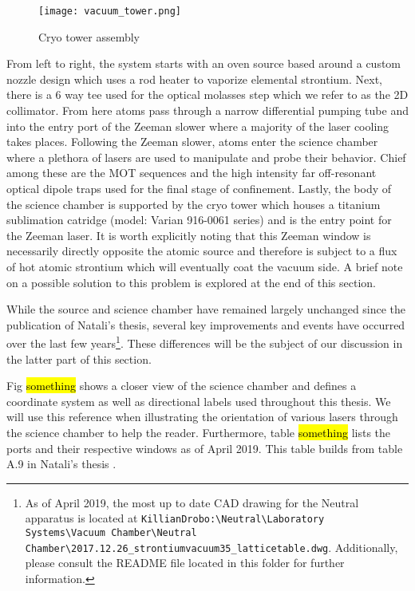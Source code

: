 	\begin{figure} 
		\centerline{
		\texttt{[image: vacuum\_tower.png]}}
		\caption{Cryo tower assembly}
		\label{fig:cryoTower}
	\end{figure}
From left to right, the system starts with an oven source based around a custom nozzle design which uses a rod heater to vaporize elemental strontium.
Next, there is a 6 way tee used for the optical molasses step which we refer to as the 2D collimator. 
From here atoms pass through a narrow differential pumping tube and into the entry port of the Zeeman slower where a majority of the laser cooling takes places. 
Following the Zeeman slower, atoms enter the science chamber where a plethora of lasers are used to manipulate and probe their behavior.
Chief among these are the MOT sequences and the high intensity far off-resonant optical dipole traps used for the final stage of confinement.
Lastly, the body of the science chamber is supported by the cryo tower which houses a titanium sublimation catridge (model: Varian 916-0061 series) and is the entry point for the Zeeman laser.
It is worth explicitly noting that this Zeeman window is necessarily directly opposite the atomic source and therefore is subject to a flux of hot atomic strontium which will eventually coat the vacuum side. A brief note on a possible solution to this problem is explored at the end of this section.

While the source and science chamber have remained largely unchanged since the publication of Natali's thesis, several key improvements and events have occurred over the last few years\footnote{As of April 2019, the most up to date CAD drawing for the Neutral apparatus is located at \texttt{KillianDrobo:\textbackslash Neutral\textbackslash Laboratory Systems\textbackslash Vacuum Chamber\textbackslash Neutral Chamber\textbackslash 2017.12.26\_strontiumvacuum35\_latticetable.dwg}. Additionally, please consult the README file located in this folder for further information.}.
These differences will be the subject of our discussion in the latter part of this section.


Fig \hl{something} shows a closer view of the science chamber and defines a coordinate system as well as directional labels used throughout this thesis. 
We will use this reference when illustrating the orientation of various lasers through the science chamber to help the reader.
Furthermore, table \hl{something} lists the ports and their respective windows as of April 2019.
This table builds from table A.9 in Natali's thesis \cite{MartinezdeEscolar2010}.

